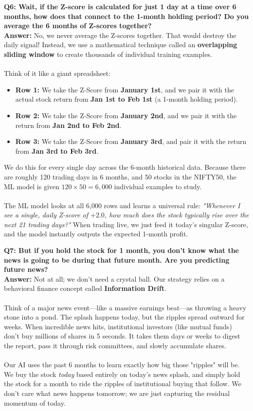 \documentclass[11pt, a4paper]{article}
\begin{document}
\textbf{\textcolor{IITBlue}{Q6: Wait, if the Z-score is calculated for just 1 day at a time over 6 months, how does that connect to the 1-month holding period? Do you average the 6 months of Z-scores together?}} \\
\textbf{Answer:} No, we never average the Z-scores together. That would destroy the daily signal! Instead, we use a mathematical technique called an \textbf{overlapping sliding window} to create thousands of individual training examples.
\\ \\
Think of it like a giant spreadsheet:
\begin{itemize}
    \item \textbf{Row 1:} We take the Z-Score from \textbf{January 1st}, and we pair it with the actual stock return from \textbf{Jan 1st to Feb 1st} (a 1-month holding period).
    \item \textbf{Row 2:} We take the Z-Score from \textbf{January 2nd}, and we pair it with the return from \textbf{Jan 2nd to Feb 2nd}.
    \item \textbf{Row 3:} We take the Z-Score from \textbf{January 3rd}, and pair it with the return from \textbf{Jan 3rd to Feb 3rd}.
\end{itemize}
We do this for every single day across the 6-month historical data. Because there are roughly 120 trading days in 6 months, and 50 stocks in the NIFTY50, the ML model is given $120 \times 50 = 6,000$ individual examples to study. 
\\ \\
The ML model looks at all 6,000 rows and learns a universal rule: \textit{"Whenever I see a single, daily Z-score of $+2.0$, how much does the stock typically rise over the next 21 trading days?"} When trading live, we just feed it today's singular Z-score, and the model instantly outputs the expected 1-month profit.

\textbf{\textcolor{IITBlue}{Q7: But if you hold the stock for 1 month, you don't know what the news is going to be during that future month. Are you predicting future news?}} \\
\textbf{Answer:} Not at all; we don't need a crystal ball. Our strategy relies on a behavioral finance concept called \textbf{Information Drift}. 
\\ \\
Think of a major news event—like a massive earnings beat—as throwing a heavy stone into a pond. The splash happens today, but the ripples spread outward for weeks. When incredible news hits, institutional investors (like mutual funds) don't buy millions of shares in 5 seconds. It takes them days or weeks to digest the report, pass it through risk committees, and slowly accumulate shares. 
\\ \\
Our AI uses the past 6 months to learn exactly how big those "ripples" will be. We buy the stock \textit{today} based entirely on today's news splash, and simply hold the stock for a month to ride the ripples of institutional buying that follow. We don't care what news happens tomorrow; we are just capturing the residual momentum of today.
\end{document}
